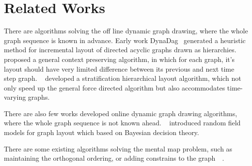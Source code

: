 \section{Related Works}

There are algorithms solving the off line dynamic graph drawing, where the whole graph sequence is known in advance.
Early work DynaDag~\cite{North:1996:GD} generated a heuristic method for incremental layout of directed
acyclic graphs drawn as hierarchies.
~\cite{Diehl:2002:GD} proposed a general context preserving algorithm, in which for each graph, it's
layout should have very limited difference between its previous and next time step graph. ~\cite{Kumar:2006:VEC} developed a stratification hierarchical layout algorithm, which not only speed up the general force directed algorithm but also accommodates time-varying graphs.

There are also few works developed online dynamic graph drawing algorithms, where the whole graph sequence is not known ahead. ~\cite{Brandes:1997:GD} introduced random field models for graph layout which based on Bayesian decision theory.

There are some existing algorithms solving the mental map problem,
such as~\cite{Misue:1995:VLC} maintaining the orthogonal ordering, or adding constrains to the graph~\cite{Bhringer:1990:HFC}~\cite{He:1998:C}. 